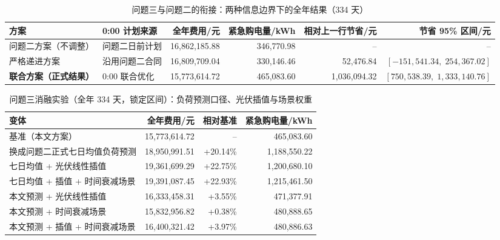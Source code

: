 \begin{table}[H]
  \centering
  \caption{问题三与问题二的衔接：两种信息边界下的全年结果（334 天）}
  \label{tab:q3-bridge}
  \small
  \begin{tabular}{llrrrr}
    \toprule
    方案 & 0:00 计划来源 & 全年费用/元 & 紧急购电量/kWh & 相对上一行节省/元 & 节省 95\% 区间/元 \\
    \midrule
    问题二方案（不调整） & 问题二日前计划 & 16,862,185.88 & 346,770.98 & -- & -- \\
    严格递进方案 & 沿用问题二合同 & 16,809,709.04 & 330,146.46 & 52,476.84 & $[-151{,}541.34,\;254{,}367.02]$ \\
    \textbf{联合方案（正式结果）} & 0:00 联合优化 & 15,773,614.72 & 465,083.60 & 1,036,094.32 & $[750{,}538.39,\;1{,}333{,}140.76]$ \\
    \bottomrule
  \end{tabular}
\end{table}

\begin{table}[H]
  \centering
  \caption{问题三消融实验（全年 334 天，锁定区间）：负荷预测口径、光伏插值与场景权重}
  \label{tab:q3-ablation}
  \small
  \begin{tabular}{lrrr}
    \toprule
    变体 & 全年费用/元 & 相对基准 & 紧急购电量/kWh \\
    \midrule
    基准（本文方案） & 15,773,614.72 & -- & 465,083.60 \\
    换成问题二正式七日均值负荷预测 & 18,950,991.51 & +20.14\% & 1,188,550.22 \\
    七日均值 + 光伏线性插值 & 19,361,699.29 & +22.75\% & 1,200,680.10 \\
    七日均值 + 插值 + 时间衰减场景 & 19,391,087.45 & +22.93\% & 1,215,461.50 \\
    本文预测 + 光伏线性插值 & 16,333,458.31 & +3.55\% & 471,377.91 \\
    本文预测 + 时间衰减场景 & 15,832,956.82 & +0.38\% & 480,888.65 \\
    本文预测 + 插值 + 时间衰减场景 & 16,400,321.42 & +3.97\% & 480,886.63 \\
    \bottomrule
  \end{tabular}
\end{table}

